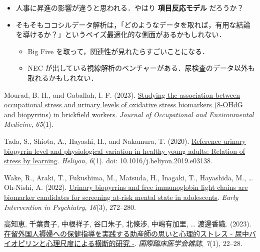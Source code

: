 \documentclass[
]{ltjsarticle}
\providecommand{\tightlist}{%
  \setlength{\itemsep}{0pt}\setlength{\parskip}{0pt}}\usepackage{longtable,booktabs,array}
\newlength{\cslhangindent}
\newenvironment{CSLReferences}[2] %
 {\begin{list}{}{%
  \setlength{\itemindent}{0pt}
  \setlength{\leftmargin}{0pt}
  \setlength{\parsep}{0pt}
  \ifodd #1
   \setlength{\leftmargin}{\cslhangindent}
   \setlength{\itemindent}{-1\cslhangindent}
  \fi
  \setlength{\itemsep}{#2\baselineskip}}}
 {\end{list}}
\begin{document}
\begin{tcolorbox}[enhanced jigsaw, leftrule=.75mm, toprule=.15mm, bottomrule=.15mm, breakable, left=2mm, rightrule=.15mm, arc=.35mm, opacityback=0, colback=white, colframe=quarto-callout-important-color-frame]

\begin{itemize}
\tightlist
\item
  人事に昇進の影響が違うと思われる．やはり \textbf{項目反応モデル}
  だろうか？
\item
  そもそもココシルデータ解析は，「どのようなデータを取れば，有用な結論を導けるか？」というベイズ最適化的な側面があるかもしれない．

  \begin{itemize}
  \tightlist
  \item
    Big Five を取って，関連性が見れたらすごいことになる．
  \item
    NEC
    が出している視線解析のベンチャーがある．尿検査のデータ以外も取れるかもしれない．
  \end{itemize}
\end{itemize}

\end{tcolorbox}

\label{refs}
\begin{CSLReferences}{1}{1}
Mourad, B. H., and Gaballah, I. F. (2023).
\href{https://journals.lww.com/joem/fulltext/2023/01000/studying_the_association_between_occupational.10.aspx}{Studying
the association between occupational stress and urinary levels of
oxidative stress biomarkers (8-OHdG and biopyrrins) in brickfield
workers}. \emph{Journal of Occupational and Environmental Medicine},
\emph{65}(1).

Tada, S., Shiota, A., Hayashi, H., and Nakamura, T. (2020).
\href{https://doi.org/10.1016/j.heliyon.2019.e03138}{Reference urinary
biopyrrin level and physiological variation in healthy young adults:
Relation of stress by learning}. \emph{Heliyon}, \emph{6}(1). doi:
10.1016/j.heliyon.2019.e03138.

Wake, R., Araki, T., Fukushima, M., Matsuda, H., Inagaki, T., Hayashida,
M., \ldots{} Oh-Nishi, A. (2022).
\href{https://doi.org/10.1111/eip.13154}{Urinary biopyrrins and free
immunoglobin light chains are biomarker candidates for screening at-risk
mental state in adolescents}. \emph{Early Intervention in Psychiatry},
\emph{16}(3), 272--280.

高知恵, 千葉貴子, 中根祥子, 谷口朱子, 北條渉, 中嶋有加里, \ldots{}
渡邊香織. (2023).
\href{https://mol.medicalonline.jp/archive/search?jo=fm0kokus&ye=2023&vo=7&issue=1}{在留外国人褥婦への保健指導を実践する助産師の思いと心理的ストレス
- 尿中バイオピリンと心理尺度による横断的研究 -}.
\emph{国際臨床医学会雑誌}, \emph{7}(1), 22--28.

\end{CSLReferences}
\end{document}
